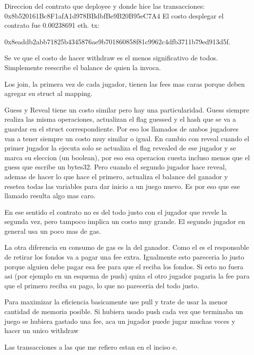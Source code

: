 \documentclass[12pt,addpoints,answers]{exam}
\begin{document}
\begin{questions}
\begin{parts}
\begin{solution} %
  Direccion del contrato que deployee y donde hice las transacciones: 0x8b520161Bc8F1afA1d978BBdbfBe9B20B95eC7A4
  El costo desplegar el contrato fue 0.00238691 eth. tx: 
  
  0x8eaddb2abb71825b4345876ae9b701860858f81c9962c4dfb3711b79ed913d5f.

  Se ve que el costo de hacer withdraw es el menos significativo de todos. Simplemente reescribe el balance de quien 
  la invoca.


  Los join, la primera vez de cada jugador, tienen las fees mas caras porque deben agregar su struct al mapping.

  Guess y Reveal tiene un costo similar pero hay una particularidad. Guess siempre realiza las misma operaciones, actualizan
  el flag guessed y el hash que se va a guardar en el struct correspondiente. Por eso los llamados de ambos jugadores van
  a tener siempre un costo muy similar o igual. En cambio con reveal cuando el primer jugador la ejecuta solo se actualiza el
  flag revealed de ese jugador y se marca su eleccion (un boolean), por eso esa operacion cuesta incluso menos que el guess que
  escribe un bytes32. Pero cuando el segundo jugador hace reveal, ademas de hacer lo que hace el primero, actualiza el balance
  del ganador y resetea todas las variables para dar inicio a un juego nuevo. Es por eso que ese llamado resulta algo mas caro.

  En ese sentido el contrato no es del todo justo con el jugador que revele la segunda vez, pero tampoco implica un costo 
  muy grande. El segundo jugador en general usa un poco mas de gas.

  La otra diferencia en consumo de gas es la del ganador. Como el es el responsable de retirar los fondos va a pagar una
  fee extra. Igualmente esto pareceria lo justo porque alguien debe pagar esa fee para que el reciba los fondos. Si esto 
  no fuera asi  (por ejemplo en un esquema de push) quiza el otro jugador pagaria la fee para que el primero reciba su pago,
  lo que no pareceria del todo justo. 

  Para maximizar la eficiencia basicamente use pull y trate de usar la menor cantidad de memoria posible. Si hubiera usado 
  push cada vez que terminaba un juego se hubiera gastado una fee, aca un jugador puede jugar muchas veces y hacer un unico withdraw
      

  Las transacciones a las que me refiero estan en el inciso e.


\end{solution}
\end{parts}
\end{questions}
\end{document}
